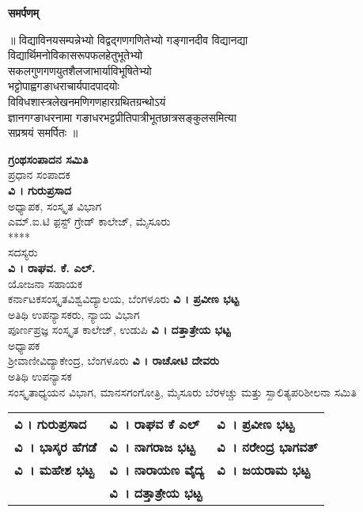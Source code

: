 \begin{mdframed}[roundcorner=10pt]
\phantom{i}
\medskip
{}
\centering
{\Large\bfseries समर्पणम्}
\bigskip

॥ विद्याविनयसम्पन्नेभ्यो विद्वद्गणगणितेभ्यो गङ्गानदीव विद्यानद्या\\
विद्यार्थिमनोविकासरूपफलहेतुभूतेभ्यो \\
सकलगुणगणयुतशैलजाभार्याविभूषितेभ्यो\\   
भट्टोपाह्वगङाधराचार्यपादपादयोः \\
विविधशास्त्रलेखनमणिगणहारग्रथितग्रन्थोऽयं\\
ज्ञानगग्ङाधरनामा गङाधरभट्टप्रीतिपात्रीभूतछात्रसङ्कुलसमित्या\\
सप्रश्रयं समर्पितः ॥
\bigskip
\phantom{i}
\end{mdframed}
\vfill
\eject
\thispagestyle{empty}
\begin{center}
{\huge\bfseries ಗ್ರಂಥಸಂಪಾದನ ಸಮಿತಿ}\\
\vfill
{\large ಪ್ರಧಾನ ಸಂಪಾದಕ}\\
{\large\bfseries ವಿ । ಗುರುಪ್ರಸಾದ}\\
ಅಧ್ಯಾಪಕ, ಸಂಸ್ಕೃತ ವಿಭಾಗ\\
ಎಮ್.ಐ.ಟಿ ಫ಼ಸ್ಟ್ ಗ್ರೇಡ್ ಕಾಲೇಜ್, ಮೈಸೂರು  \\
****\\
\vfill
{\large ಸದಸ್ಯರು}\\
{\large\bfseries ವಿ । ರಾಘವ. ಕೆ. ಎಲ್.}\\
ಯೋಜನಾ ಸಹಾಯಕ\\
ಕರ್ನಾಟಕಸಂಸ್ಕೃತವಿಶ್ವವಿದ್ಯಾಲಯ, ಬೆಂಗಳೂರು
\vfill
{\large\bfseries ವಿ । ಪ್ರವೀಣ ಭಟ್ಟ}\\
ಅತಿಥಿ ಉಪನ್ಯಾಸಕರು, ನ್ಯಾಯ ವಿಭಾಗ\\
ಪೂರ್ಣಪ್ರಜ್ಞ ಸಂಸ್ಕೃತ ಕಾಲೇಜ್, ಉಡುಪಿ
\vfill
{\large\bfseries ವಿ । ದತ್ತಾತ್ರೇಯ ಭಟ್ಟ}\\
ಅಧ್ಯಾಪಕ\\
ಶ್ರೀವಾಣೀವಿದ್ಯಾಕೇಂದ್ರ, ಬೆಂಗಳೂರು
\vfill
{\large\bfseries ವಿ । ರಾಚೋಟಿ ದೇವರು}\\
ಅತಿಥಿ ಉಪನ್ಯಾಸಕ\\
ಸಂಸ್ಕೃತಾಧ್ಯಯನ ವಿಭಾಗ, ಮಾನಸಗಂಗೋತ್ರಿ, ಮೈಸೂರು
\vfill
{\large ಬೆರಳಚ್ಚು ಮತ್ತು ಸ್ಖಾಲಿತ್ಯಪರಿಶೀಲನಾ ಸಮಿತಿ}\\[4pt]
\begin{tabular}{@{}lll@{}}
{\bfseries ವಿ । ಗುರುಪ್ರಸಾದ} &	{\bfseries ವಿ~। ರಾಘವ ಕೆ ಎಲ್} & {\bfseries ವಿ~। ಪ್ರವೀಣ ಭಟ್ಟ}\\			
{\bfseries ವಿ~। ಭಾಸ್ಕರ ಹೆಗಡೆ} & {\bfseries ವಿ~। ನಾಗರಾಜ ಭಟ್ಟ} & {\bfseries ವಿ~। ನರೇಂದ್ರ ಭಾಗವತ್}\\
{\bfseries ವಿ~। ಮಹೇಶ ಭಟ್ಟ} & {\bfseries  ವಿ~। ನಾರಾಯಣ ವೈದ್ಯ} & {\bfseries ವಿ~। ಜಯರಾಮ ಭಟ್ಟ}\\
                        & {\bfseries ವಿ~। ದತ್ತಾತ್ರೇಯ ಭಟ್ಟ} & 
\end{tabular}
\end{center}

